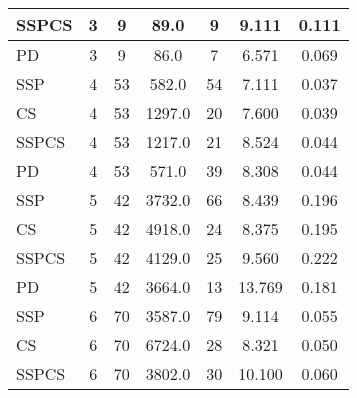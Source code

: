 \documentclass{article}
\begin{document}
\begin{table}[H]
{\begin{tabular}{|l|c|c|c|c|c|c|}
SSPCS              & 3              & 9                 & 89.0                   & 9              & 9.111                    & 0.111                                  \\ \hline
PD                 & 3              & 9                 & 86.0                   & 7              & 6.571                    & 0.069                                  \\ \hline
SSP                & 4              & 53                & 582.0                  & 54             & 7.111                    & 0.037                                  \\ \hline
CS                 & 4              & 53                & 1297.0                 & 20             & 7.600                    & 0.039                                  \\ \hline
SSPCS              & 4              & 53                & 1217.0                 & 21             & 8.524                    & 0.044                                  \\ \hline
PD                 & 4              & 53                & 571.0                  & 39             & 8.308                    & 0.044                                  \\ \hline
SSP                & 5              & 42                & 3732.0                 & 66             & 8.439                    & 0.196                                  \\ \hline
CS                 & 5              & 42                & 4918.0                 & 24             & 8.375                    & 0.195                                  \\ \hline
SSPCS              & 5              & 42                & 4129.0                 & 25             & 9.560                    & 0.222                                  \\ \hline
PD                 & 5              & 42                & 3664.0                 & 13             & 13.769                   & 0.181                                  \\ \hline
SSP                & 6              & 70                & 3587.0                 & 79             & 9.114                    & 0.055                                  \\ \hline
CS                 & 6              & 70                & 6724.0                 & 28             & 8.321                    & 0.050                                  \\ \hline
SSPCS              & 6              & 70                & 3802.0                 & 30             & 10.100                   & 0.060                                  \\ \hline

\end{tabular}}
\end{table}
\end{document}
